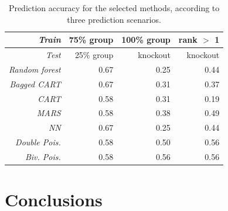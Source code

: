 \documentclass{statsoc}
\begin{document}
\begin{center}
\begin{table}
\caption{Prediction accuracy for the selected methods, according to three prediction  scenarios.}
\begin{tabular}{|r|rrr|}
\hline 
 \emph{Train}& 75\% group  & 100\% group  & rank $>$ 1   \\ 
  \hline
\emph{Test} & 25\% group & knockout & knockout\\ 
  \hline
\emph{Random forest} & 0.67 & 0.25 & 0.44 \\ 
  \emph{Bagged CART} & 0.67 & 0.31 & 0.37  \\ 
  \emph{CART} & 0.58 & 0.31 & 0.19  \\ 
  \emph{MARS} & 0.58 & 0.38 & 0.49 \\ 
  \emph{NN} & 0.67 & 0.25 & 0.44  \\ 
  \emph{Double Pois.} & 0.58 & 0.50 & 0.56  \\ 
  \emph{Biv. Pois.} & 0.58 & 0.56 & 0.56  \\ 
   \hline
\end{tabular}
\end{table}
\end{center}
%


\section{Conclusions}







\end{document}

